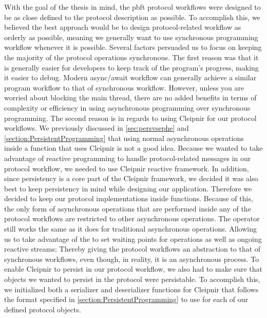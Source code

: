 With the goal of the thesis in mind, the \ac{pbft} protocol workflows were designed to be as close defined to the protocol description as possible. To accomplish this, we believed the best approach would be to design protocol-related workflow as orderly as possible, meaning we generally want to use synchronous programming workflow whenever it is possible. Several factors persuaded us to focus on keeping the majority of the protocol operations synchronous. The first reason was that it is generally easier for developers to keep track of the program’s progress, making it easier to debug. Modern async/await workflow can generally achieve a similar program workflow to that of synchronous workflow. However, unless you are worried about blocking the main thread, there are no added benefits in terms of complexity or efficiency in using asynchronous programming over synchronous programming. 
The second reason is in regards to using Cleipnir for our protocol workflows. We previously discussed in \autoref{sec:persvsephe} and \autoref{section:PersistentProgramming} that using normal asynchronous operations inside a function that uses Cleipnir is not a good idea. Because we wanted to take advantage of reactive programming to handle protocol-related messages in our protocol workflow, we needed to use Cleipnir reactive framework. In addition, since persistency is a core part of the Cleipnir framework, we decided it was also best to keep persistency in mind while designing our application. Therefore we decided to keep our protocol implementations inside  functions. Because of this, the only form of asynchronous operations that are performed inside any of the protocol workflows are restricted to other  asynchronous operations. The  operator still works the same as it does for traditional asynchronous operations. Allowing us to take advantage of the  to set waiting points for  operations as well as ongoing reactive streams; Thereby giving the protocol workflows an abstraction to that of synchronous workflows, even though, in reality, it is an asynchronous process. 
To enable Cleipnir to persist in our protocol workflow, we also had to make sure that objects we wanted to persist in the protocol were persistable. To accomplish this, we initialized both a serializer and deserializer functions for Cleipnir that follows the format specified in \autoref{section:PersistentProgramming} to use for each of our defined protocol objects.  
